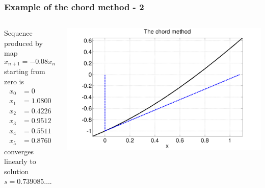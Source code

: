 \documentclass{beamer}
\begin{document}
\begin{frame}
  \frametitle{Example of the chord method - 2}

  \begin{columns}
    \begin{column}{0.5\textwidth}
      \begin{overlayarea}{\textwidth}{0.9\textheight}
        {
          Sequence produced by map
          \begin{equation*}
            x_{n+1} = -0.08 x_n + 1.08 \cos(x_n)
          \end{equation*}
          starting from zero is
          \begin{align*}
            x_0 & = 0 \\
            x_1 & =    1.0800 \\
            x_2 & =    0.4226 \\
            x_3 & =    0.9512 \\
            x_4 & =    0.5511 \\
            x_5 & = 0.8760
          \end{align*}
        }
        {
          converges linearly to solution $s = 0.739085\dots$.
        }
      \end{overlayarea}
    \end{column}
    \begin{column}{0.5\textwidth}
      \begin{overlayarea}{\textwidth}{0.6\textheight}
        {
          \begin{center}
            \includegraphics[width=\textwidth]{figures/ChordMap2}
          \end{center}
        }

\end{overlayarea}
\end{column}
\end{columns}
\end{frame}
\end{document}
